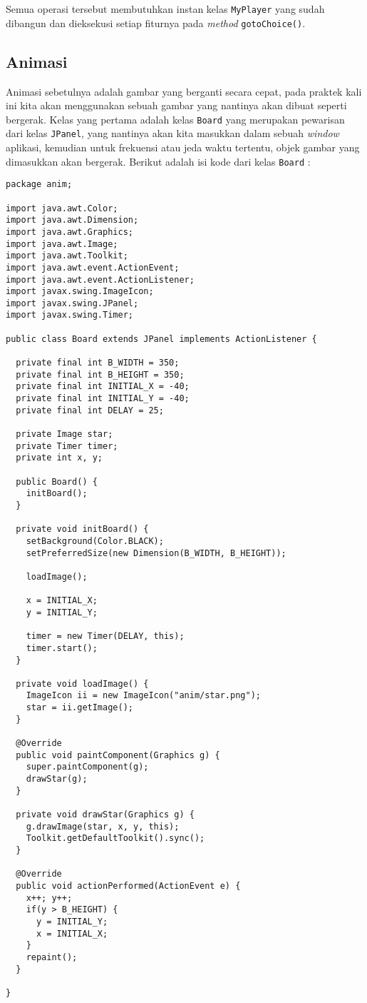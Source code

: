 Semua operasi tersebut membutuhkan instan kelas \texttt{MyPlayer} yang sudah dibangun dan dieksekusi setiap fiturnya pada \textit{method} \texttt{gotoChoice()}.

\subsection{Animasi}

Animasi sebetulnya adalah gambar yang berganti secara cepat, pada praktek kali ini kita akan menggunakan sebuah gambar yang nantinya akan dibuat seperti bergerak. Kelas yang pertama adalah kelas \texttt{Board} yang merupakan pewarisan dari kelas \texttt{JPanel}, yang nantinya akan kita masukkan dalam sebuah \textit{window} aplikasi, kemudian untuk frekuensi atau jeda waktu tertentu, objek gambar yang dimasukkan akan bergerak. Berikut adalah isi kode dari kelas \texttt{Board} :

\begin{lstlisting}
package anim;

import java.awt.Color;
import java.awt.Dimension;
import java.awt.Graphics;
import java.awt.Image;
import java.awt.Toolkit;
import java.awt.event.ActionEvent;
import java.awt.event.ActionListener;
import javax.swing.ImageIcon;
import javax.swing.JPanel;
import javax.swing.Timer;

public class Board extends JPanel implements ActionListener {
  
  private final int B_WIDTH = 350;
  private final int B_HEIGHT = 350;
  private final int INITIAL_X = -40;
  private final int INITIAL_Y = -40;
  private final int DELAY = 25;
  
  private Image star;
  private Timer timer;
  private int x, y;
  
  public Board() {
  	initBoard();
  }
  
  private void initBoard() {
    setBackground(Color.BLACK);
    setPreferredSize(new Dimension(B_WIDTH, B_HEIGHT));
    
    loadImage();
    
    x = INITIAL_X;
    y = INITIAL_Y;
    
    timer = new Timer(DELAY, this);
    timer.start();
  }
  
  private void loadImage() {
    ImageIcon ii = new ImageIcon("anim/star.png");
    star = ii.getImage();
  }
  
  @Override
  public void paintComponent(Graphics g) {
    super.paintComponent(g);
    drawStar(g);
  }
  
  private void drawStar(Graphics g) {
    g.drawImage(star, x, y, this);
    Toolkit.getDefaultToolkit().sync();
  }
  
  @Override
  public void actionPerformed(ActionEvent e) {
    x++; y++;
    if(y > B_HEIGHT) {
      y = INITIAL_Y;
      x = INITIAL_X;
    }
    repaint();
  }
  
}
\end{lstlisting}

